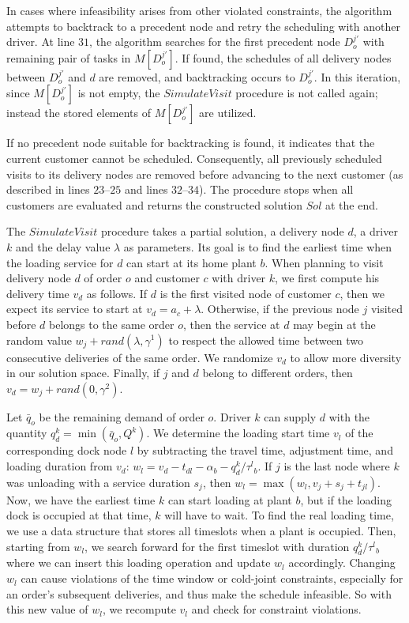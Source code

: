 \documentclass{article}
\begin{document}
In cases where infeasibility arises from other violated constraints, the algorithm attempts to backtrack to a precedent node and retry the scheduling with another driver. At line $31$, the algorithm searches for the first precedent node $D^{j'}_o$ with remaining pair of tasks in $M[D^{j'}_o]$. If found, the schedules of all delivery nodes between $D^{j'}_o$ and $d$ are removed, and backtracking occurs to $D^{j'}_o$. In this iteration, since $M[D^{j'}_o]$ is not empty, the $SimulateVisit$ procedure is not called again; instead the stored elements of $M[D^{j'}_o]$ are utilized.

If no precedent node suitable for backtracking is found, it indicates that the current customer cannot be scheduled. Consequently, all previously scheduled visits to its delivery nodes are removed before advancing to the next customer (as described in lines $23$--$25$ and lines $32$--$34$). The procedure stops when all customers are evaluated and returns the constructed solution $Sol$ at the end.

The $SimulateVisit$ procedure takes a partial solution, a delivery node $d$, a driver $k$ and the delay value $\lambda$ as parameters. Its goal is to find the earliest time when the loading service for $d$ can start at its home plant $b$. When planning to visit delivery node $d$ of order $o$ and customer $c$ with driver $k$, we first compute his delivery time $v_d$ as follows. If $d$ is the first  visited node of customer $c$, then we expect its service to start at $v_d = a_c + \lambda$. Otherwise, if the previous node $j$ visited before $d$ belongs to the same order $o$, then the service at $d$ may begin at the random value $w_j + rand(\lambda, \gamma^1)$ to respect the allowed time between two consecutive deliveries of the same order. We randomize $v_d$ to allow more diversity in our solution space. Finally, if $j$ and $d$ belong to different orders, then $v_d = w_j + rand(0,\gamma^2)$.

Let $\bar{q}_o$ be the remaining demand of order $o$. Driver $k$ can supply $d$ with the quantity $q^k_d= \min(\bar{q}_o,Q^k)$. We determine the loading start time $v_l$ of the corresponding dock node $l$ by subtracting the travel time, adjustment time, and loading duration from $v_d$: $w_l = v_d - t_{dl} - \alpha_b - q^k_{d}/\tau^l{_b} $. If $j$ is the last node where $k$ was unloading with a service duration $s_j$, then $w_l= \max(w_l, v_j + s_{j} + t_{jl})$. Now, we have the earliest time $k$ can start loading at plant $b$, but if the loading dock is occupied at that time, $k$ will have to wait. To find the real loading time, we use a data structure that stores all timeslots when a plant is occupied. Then, starting from $w_l$, we search forward for the first timeslot with duration $q^k_{d}/\tau^l{_b}$ where we can insert this loading operation and update $w_l$ accordingly. Changing $w_l$ can cause violations of the time window or cold-joint constraints, especially for an order's subsequent deliveries, and thus make the schedule infeasible. So with this new value of $w_l$, we recompute $v_l$ and check for constraint violations.
\end{document}
